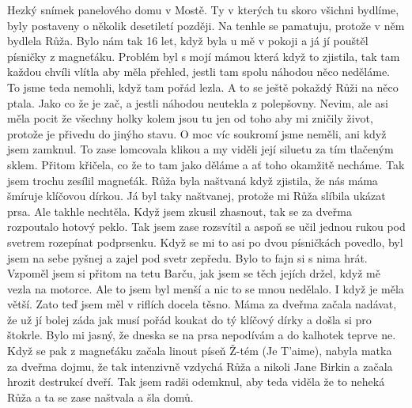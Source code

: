 
Hezký snímek panelového domu v Mostě. Ty v kterých tu skoro všichni
bydlíme, byly postaveny o několik desetiletí později. Na tenhle se
pamatuju, protože v něm bydlela Růža. Bylo nám tak 16 let, když byla u
mě v pokoji a já jí pouštěl písničky z magneťáku. Problém byl s mojí
mámou která když to zjistila, tak tam každou chvíli vlítla aby měla
přehled, jestli tam spolu náhodou něco neděláme. To jsme teda nemohli,
když tam pořád lezla. A to se ještě pokaždý Růži na něco ptala. Jako
co že je zač, a jestli náhodou neutekla z polepšovny. Nevim, ale asi
měla pocit že všechny holky kolem jsou tu jen od toho aby mi zničily
život, protože je přivedu do jinýho stavu. O moc víc soukromí jsme
neměli, ani když jsem zamknul. To zase lomcovala klikou a my viděli
její siluetu za tím tlačeným sklem. Přitom křičela, co že to tam jako
děláme a ať toho okamžitě necháme. Tak jsem trochu zesílil magneťák.
Růža byla naštvaná když zjistila, že nás máma šmíruje klíčovou dírkou.
Já byl taky naštvanej, protože mi Růža slíbila ukázat prsa. Ale takhle
nechtěla. Když jsem zkusil zhasnout, tak se za dveřma rozpoutalo
hotový peklo. Tak jsem zase rozsvítil a aspoň se učil jednou rukou pod
svetrem rozepínat podprsenku. Když se mi to asi po dvou písničkách
povedlo, byl jsem na sebe pyšnej a zajel pod svetr zepředu. Bylo to
fajn si s nima hrát. Vzpoměl jsem si přitom na tetu Barču, jak jsem se
těch jejích držel, když mě vezla na motorce. Ale to jsem byl menší a
nic to se mnou nedělalo. I když je měla větší. Zato teď jsem měl v
riflích docela těsno. Máma za dveřma začala nadávat, že už jí bolej
záda jak musí pořád koukat do tý klíčový dírky a došla si pro štokrle.
Bylo mi jasný, že dneska se na prsa nepodívám a do kalhotek teprve ne.
Když se pak z magneťáku začala linout píseň Ž-tém (Je T'aime), nabyla
matka za dveřma dojmu, že tak intenzivně vzdychá Růža a nikoli Jane
Birkin a začala hrozit destrukcí dveří. Tak jsem radši odemknul, aby
teda viděla že to neheká Růža a ta se zase naštvala a šla domů.

